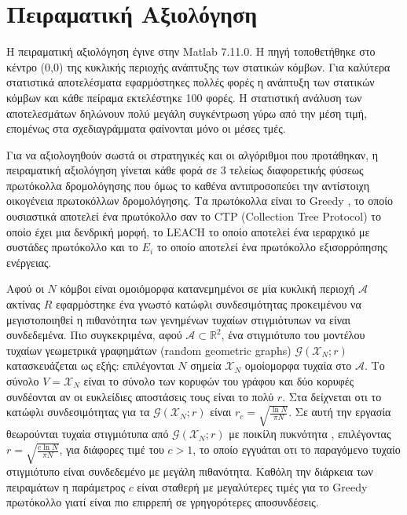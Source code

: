 

\chapter{Πειραματική Αξιολόγηση}\label{ch:results}
Η πειραματική αξιολόγηση έγινε στην Matlab 7.11.0. Η πηγή τοποθετήθηκε στο κέντρο (0,0) της κυκλικής περιοχής ανάπτυξης των στατικών κόμβων. Για καλύτερα στατιστικά
αποτελέσματα εφαρμόστηκες πολλές φορές η ανάπτυξη των στατικών κόμβων και κάθε πείραμα εκτελέστηκε 100 φορές. Η στατιστική ανάλυση των αποτελεσμάτων δηλώνουν πολύ
μεγάλη συγκέντρωση γύρω από την μέση τιμή, επομένως στα σχεδιαγράμματα φαίνονται μόνο οι μέσες τμές.

Για να αξιολογηθούν σωστά οι στρατηγικές και οι αλγόριθμοι που προτάθηκαν, η πειραματική αξιολόγηση γίνεται κάθε φορά σε 3 τελείως διαφορετικής φύσεως πρωτόκολλα
δρομολόγησης που όμως το καθένα αντιπροσοπεύει την αντίστοιχη οικογένεια πρωτοκόλλων δρομολόγησης. Τα πρωτόκολλα είναι το Greedy \cite{greedy_protocol}, το οποίο
ουσιαστικά αποτελεί ένα πρωτόκολλο σαν το CTP (Collection Tree Protocol) το οποίο έχει μια δενδρική μορφή, το LEACH \cite{leach_protocol} το οποίο αποτελεί ένα
ιεραρχικό με συστάδες πρωτόκολλο και το $E_{i}$ \cite{debp_protocol} το οποίο αποτελεί ένα πρωτόκολλο εξισορρόπησης ενέργειας.

Αφού οι $N$ κόμβοι είναι ομοιόμορφα κατανεμημένοι σε μία κυκλική περιοχή $\mathcal{A}$ ακτίνας $R$ εφαρμόστηκε ένα γνωστό κατώφλι συνδεσιμότητας προκειμένου να
μεγιστοποιηθεί η πιθανότητα των γενημένων τυχαίων στιγμιότυπων να είναι συνδεδεμένα. Πιο συγκεκριμένα, αφού $\mathcal{A}\subset \mathbb{R}^2$, ένα στιγμιότυπο του
μοντέλου τυχαίων γεωμετρικά γραφημάτων (random geometric graphs) $\mathcal{G}(\mathcal{X}_N;r)$ κατασκευάζεται ως εξής: επιλέγονται $N$ σημεία $\mathcal{X}_N$
ομοίομορφα τυχαία στο $\mathcal{A}$. Το σύνολο $V = \mathcal{X}_N$  είναι το σύνολο των κορυφών του γράφου και δύο κορυφές συνδέονται αν οι ευκλείδιες αποστάσεις
τους είναι το πολύ $r$. Στα \cite{rg1,rg2} δείχνεται οτι το κατώφλι συνδεσιμότητας για τα $\mathcal{G}(\mathcal{X}_N;r)$ είναι $r_c = \sqrt{\frac{\ln N}{\pi N}}$. Σε
αυτή την εργασία θεωρούνται τυχαία στιγμιότυπα από $\mathcal{G}(\mathcal{X}_N;r)$ με ποικίλη πυκνότητα , επιλέγοντας $r = \sqrt{\frac{c\ln N}{\pi N}}$, για διάφορες
τιμέ του $c>1$, το οποίο εγγυάται οτι το παραγόμενο τυχαίο στιγμιότυπο είναι συνδεδεμένο με μεγάλη πιθανότητα. Καθόλη την διάρκεια των πειραμάτων η παράμετρος $c$
είναι σταθερή με μεγαλύτερες τιμές για το Greedy πρωτόκολλο γιατί είναι πιο επιρρεπή σε γρηγορότερες αποσυνδέσεις.


